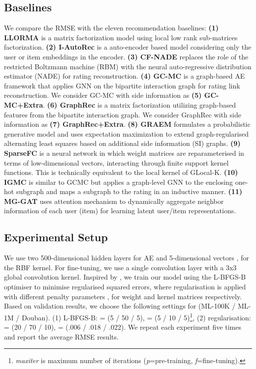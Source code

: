\documentclass[sigconf]{acmart}
\begin{document}
\subsection{Baselines}
We compare the RMSE with the eleven recommendation baselines: \textbf{(1) LLORMA\cite{lee2016llorma} } is a matrix factorization model using local low rank sub-matrices factorization. \textbf{(2) I-AutoRec\cite{sedhain2015autorec}} is a auto-encoder based model considering only the user or item embeddings in the encoder. \textbf{(3) CF-NADE\cite{zheng2016neural}} replaces the role of the restricted Boltzmann machine (RBM) with the neural auto-regressive distribution estimator (NADE) for rating reconstruction. \textbf{(4) GC-MC\cite{berg2018graph}} is a graph-based AE framework that applies GNN on the bipartite interaction graph for rating link reconstruction. We consider GC-MC with side information as \textbf{(5) GC-MC+Extra}. \textbf{(6) GraphRec\cite{rashed2019attribute}} is a matrix factorization utilizing graph-based features from the bipartite interaction graph. We consider GraphRec with side information as \textbf{(7) GraphRec+Extra}. \textbf{(8) GRAEM\cite{strahl2020scalable}} formulates a probabilistic generative model and uses expectation maximization to extend graph-regularised alternating least squares based on additional side information (SI) graphs. \textbf{(9) SparseFC\cite{muller2018kernelized}} is a neural network in which weight matrices are reparameterised in terms of low-dimensional vectors, interacting through finite support kernel functions. This is technically equivalent to the local kernel of GLocal-K. \textbf{(10) IGMC\cite{zhang2019inductive}} is similar to GCMC but applies a graph-level GNN to the enclosing one-hot subgraph and maps a subgraph to the rating in an inductive manner. \textbf{(11) MG-GAT\cite{ugla2020interpretable}} uses attention mechanism to dynamically aggregate neighbor information of each user (item) for learning latent user/item representations.

\subsection{Experimental Setup}
We use two 500-dimensional hidden layers for AE and 5-dimensional vectors ,  for the RBF kernel. For fine-tuning, we use a single convolution layer with a 3x3 global convolution kernel. Inspired by \cite{sedhain2015autorec}, we train our model using the L-BFGS-B optimiser to minimise regularised squared errors, where  regularisation is applied with different penalty parameters ,  for weight and kernel matrices respectively. Based on validation results, we choose the following settings for (ML-100K / ML-1M / Douban). (1) L-BFGS-B: \textit{} = (5 / 50 / 5), \textit{} = (5 / 10 / 5)\footnote{\textit{maxiter} is maximum number of iterations (\textit{p}=pre-training, \textit{f}=fine-tuning).}, (2)  regularisation:  = (20 / 70 / 10),  = (.006 / .018 / .022). We repeat each experiment five times and report the average RMSE results.
\end{document}

